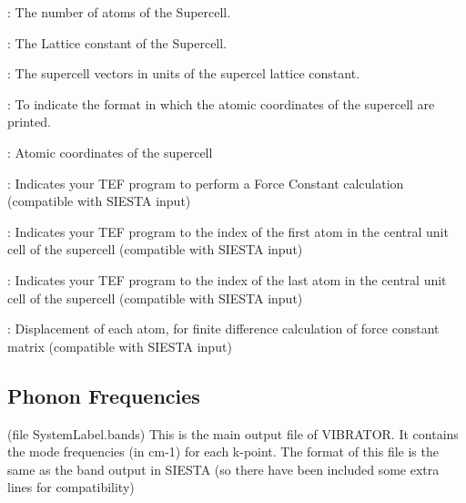 \begin{description}
\itemsep 10pt
\parsep 0pt

\item[{\bf NumberOfAtoms}]: 
The number of atoms of the Supercell.

\item[{\bf LatticeConstant}]: The Lattice constant
of the Supercell.

\item[{\bf LatticeVectors}]: 
The supercell vectors 
in units of the supercel lattice constant.

\item[{\bf AtomicCoordinatesFormat}]:  To indicate the format
in which the atomic coordinates of the supercell are printed.

\item[{\bf AtomicCoordinatesAndAtomicSpecies}]: Atomic coordinates
of the supercell

\item[{\bf MD.TypeOfRun  FC}]: Indicates your TEF program to
perform a Force Constant calculation (compatible with SIESTA input)

\item[{\bf MD.FCfirst}]: Indicates your TEF program to
the index of the first atom in the central unit cell
of the supercell
(compatible with SIESTA input)

\item[{\bf MD.FClast}]: Indicates your TEF program to
the index of the last atom in the central unit cell
of the supercell
(compatible with SIESTA input)

\item[{\bf MD.FCdispl}]: Displacement of each atom,
for finite difference calculation of force constant matrix
(compatible with SIESTA input)

\end{description}
 
\subsection{Phonon Frequencies}
(file SystemLabel.bands) 
This is the main output file
of VIBRATOR. It contains the mode frequencies (in cm-1) for each k-point.
The format of this file is the same as the band output in SIESTA
(so there have been included some extra lines for compatibility)


